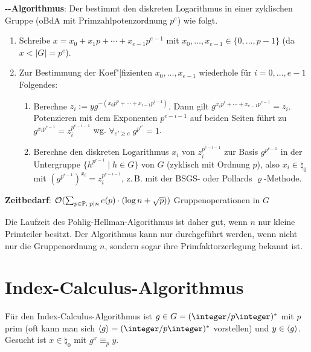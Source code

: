 \textbf{--Algorithmus}:
Der  bestimmt den diskreten Logarithmus
in einer zyklischen Gruppe (oBdA mit Primzahlpotenzordnung $p^e$) wie folgt.
\begin{enumerate}
    \item
    Schreibe $x = x_0 + x_1 p + \dotsb + x_{e-1} p^{e-1}$ mit
    $x_0, \dotsc, x_{e-1} \in \{0, \dotsc, p-1\}$
    (da $x < |G| = p^e$).

    \item
    Zur Bestimmung der Koef"|fizienten $x_0, \dotsc, x_{e-1}$ wiederhole für
    $i = 0, \dotsc, e - 1$ Folgendes:
    \begin{enumerate}
        \item
        Berechne $z_i := yg^{-(x_0 p^0 + \dotsb + x_{i-1} p^{i-1})}$.
        Dann gilt $g^{x_i p^i + \dotsb + x_{e-1} p^{e-1}} = z_i$.
        Potenzieren mit dem Exponenten $p^{e-i-1}$ auf beiden Seiten führt zu
        $g^{x_i p^{e-1}} = z_i^{p^{e-i-1}}$ wg. $\forall_{e' \ge e}\; g^{p^{e'}} = 1$.

        \item
        Berechne den diskreten Logarithmus $x_i$ von $z_i^{p^{e-i-1}}$ zur Basis $g^{p^{e-1}}$
        in der Untergruppe $\{h^{p^{e-1}} \;|\; h \in G\}$ von $G$
        (zyklisch mit Ordnung $p$),
        also $x_i \in \natural_0$ mit $(g^{p^{e-1}})^{x_i} = z_i^{p^{e-i-1}}$,
        z.\,B. mit der BSGS- oder Pollards $\varrho$-Methode.
    \end{enumerate}
\end{enumerate}

\linie

\textbf{Zeitbedarf}:
$\mathcal{O}(\sum_{p \in \mathbb{P},\; p \mid n} e(p) \cdot (\log n + \sqrt{p}))$ Gruppenoperationen in $G$

Die Laufzeit des Pohlig-Hellman-Algorithmus ist daher gut, wenn $n$ nur kleine Primteiler besitzt.
Der Algorithmus kann nur durchgeführt werden, wenn nicht nur die Gruppenordnung $n$,
sondern sogar ihre Primfaktorzerlegung bekannt ist.

\pagebreak

\section{%
    Index-Calculus-Algorithmus%
}

Für den Index-Calculus-Algorithmus ist $g \in G = (\ZpZ)^\ast$ mit $p$ prim
(oft kann man sich $\erzeugnis{g} = (\ZpZ)^\ast$ vorstellen) und $y \in \langle g\rangle$.
Gesucht ist $x \in \natural_0$ mit $g^x \equiv_p y$.


